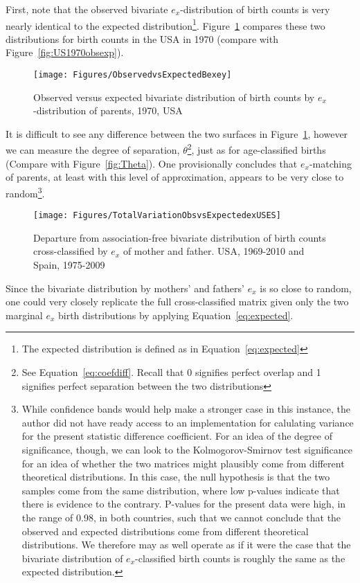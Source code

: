  \FloatBarrier
\label{sec:exobsexpected}
First, note that the observed bivariate $e_x$-distribution of birth counts is
very nearly identical to the expected distribution\footnote{The expected
distribution is defined as in Equation~\eqref{eq:expected}}.
Figure~\ref{fig:US1970obsexpex} compares these two distributions for birth 
counts in the USA in 1970 (compare with Figure~\ref{fig:US1970obsexp}). 

\begin{figure}[ht!]
        \centering  
          \caption{Observed versus expected bivariate distribution of birth
          counts by $e_x$-distribution of parents, 1970, USA}
           \texttt{[image: Figures/ObservedvsExpectedBexey]}
          \label{fig:US1970obsexpex}
\end{figure}

It is
difficult to see any difference between the two surfaces in
Figure~\ref{fig:US1970obsexpex}, however we can measure the degree of
separation, $\theta$\footnote{See Equation~\eqref{eq:coefdiff}. Recall that 0 signifies
perfect overlap and 1 signifies perfect separation between the two
distributions}, just as for age-classified births (Compare with
Figure~\ref{fig:Theta}). One provisionally concludes that $e_x$-matching of
parents, at least with this level of approximation, appears to be very close to
random\footnote{While confidence bands would help make a stronger case in this
instance, the author did not have ready access to an implementation for
calulating variance for the present statistic difference coefficient. For an
idea of the degree of significance, though, we can look to the
Kolmogorov-Smirnov test significance
for an idea of whether the two matrices might plausibly come from different
theoretical distributions. In this case, the null hypothesis is that
the two samples
come from the same distribution, where low p-values indicate
that there is evidence to the contrary. P-values for the present data were
high, in the range of 0.98, in both countries, such that we cannot conclude
that the observed and expected distributions come from different theoretical
distributions. We therefore may as well operate as if it were the case
that the bivariate
distribution of $e_x$-classified birth counts is roughly the same as the
expected distribution.}.

\begin{figure}[ht!]
        \centering  
          \caption{Departure from association-free bivariate distribution of
          birth counts cross-classified by $e_x$ of mother and father. USA,
          1969-2010 and Spain, 1975-2009}
           \texttt{[image: Figures/TotalVariationObsvsExpectedexUSES]}
          \label{fig:TotalVarobsexpex}
\end{figure}

Since the bivariate distribution by mothers' and fathers' $e_x$ is so close
to random, one could very closely replicate the full cross-classified matrix 
given only the two marginal
$e_x$ birth distributions by applying Equation~\eqref{eq:expected}. 

